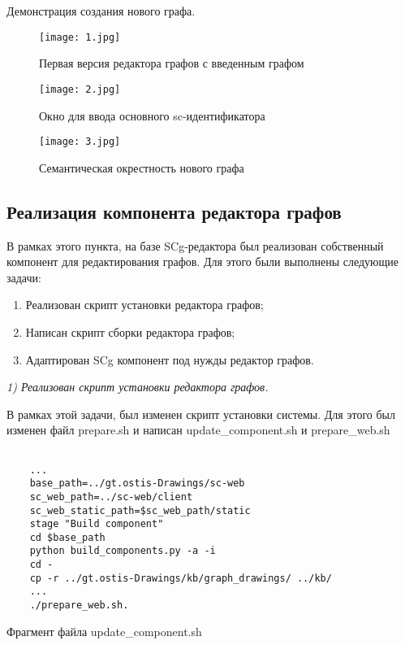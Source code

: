 Демонстрация создания нового графа.

\begin{figure}[H]
  \centering
  \texttt{[image: 1.jpg]}
  \caption{Первая версия редактора графов с введенным графом}
  \label{fig:hardware:sdr_pipeline}
\end{figure}

\begin{figure}[H]
  \centering
  \texttt{[image: 2.jpg]}
  \caption{Окно для ввода основного sc-идентификатора}
  \label{fig:hardware:sdr_pipeline}
\end{figure}

\begin{figure}[H]
  \centering
  \texttt{[image: 3.jpg]}
  \caption{Семантическая окрестность нового графа}
  \label{fig:hardware:sdr_pipeline}
\end{figure}

\newpage
\subsection{Реализация компонента редактора графов}

В рамках этого пункта, на базе SCg-редактора был реализован собственный компонент для редактирования графов. Для этого были выполнены следующие задачи:

\begin{enumerate}
\item{Реализован скрипт установки редактора графов;}
\item{Написан скрипт сборки редактора графов;}
\item{Адаптирован SCg компонент под нужды редактор графов.}
\end{enumerate}

{\itshape
1) Реализован скрипт установки редактора графов.}

В рамках этой задачи, был изменен скрипт установки системы. Для этого был изменен файл prepare.sh и написан update\_component.sh и prepare\_web.sh

\begin{listing}[H]
  \begin{verbatim}
  
    ...
    base_path=../gt.ostis-Drawings/sc-web
    sc_web_path=../sc-web/client
    sc_web_static_path=$sc_web_path/static
    stage "Build component"
    cd $base_path
    python build_components.py -a -i
    cd -
    cp -r ../gt.ostis-Drawings/kb/graph_drawings/ ../kb/
    ...
    ./prepare_web.sh.
  \end{verbatim}
  \caption{Фрагмент файла update\_component.sh}
  \label{lst:practice:modelling_example}
\end{listing}

